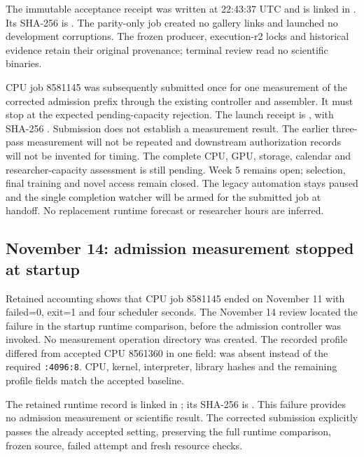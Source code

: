 The immutable acceptance receipt was written at 22:43:37 UTC and is linked in
. Its SHA-256 is
.
The parity-only job created no gallery links and launched no development
corruptions. The frozen producer, execution-r2 locks and historical evidence
retain their original provenance; terminal review read no scientific binaries.

CPU job 8581145 was subsequently submitted once for one measurement of the
corrected admission prefix through the existing controller and assembler.
It must stop at the expected pending-capacity rejection. The launch receipt is
,
with SHA-256
.
Submission does not establish a measurement result. The earlier three-pass measurement will not be
repeated and downstream authorization records will not be invented for timing.
The complete CPU, GPU, storage, calendar and researcher-capacity assessment is
still pending. Week 5 remains open; selection, final training and novel access
remain closed. The legacy automation stays paused and the single completion
watcher will be armed for the submitted job at handoff. No
replacement runtime forecast or researcher hours are inferred.

\subsection*{November 14: admission measurement stopped at startup}

Retained accounting shows that CPU job 8581145 ended on November 11 with
failed=0, exit=1 and four scheduler seconds. The November 14 review located
the failure in the startup runtime comparison, before the admission controller
was invoked. No measurement operation directory was created. The recorded
profile differed from accepted CPU 8561360 in one field:
 was absent instead of the required
\texttt{:4096:8}. CPU, kernel, interpreter, library hashes and the remaining
profile fields match the accepted baseline.

The retained runtime record is linked in
; its SHA-256 is
.
This failure provides no admission measurement or scientific result. The
corrected submission explicitly passes the already accepted setting,
preserving the full runtime comparison, frozen source, failed attempt and
fresh resource checks.


